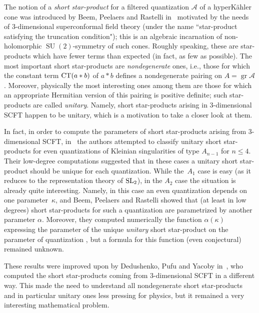 \documentclass[pdftex]{sigma}
\newcommand{\SU}{\mathop{\mathrm{SU}}\nolimits}
\theoremstyle{definition}
\numberwithin{equation}{section}
\begin{document}
The notion of a {\it short star-product} for a filtered quantization $\mathcal A$ of a hyperK\"ahler cone was introduced by Beem, Peelaers and Rastelli in~\cite{BPR} motivated by the needs of 3-dimensional super\-conformal field theory (under the name ``star-product satisfying the truncation condition"); this is an algebraic incarnation of non-holomorphic $\SU(2)$-symmetry of such cones. Roughly speaking, these are star-products which have fewer terms than expected (in fact, as few as possible). The most important short star-products are {\it nondegenerate} ones, i.e., those for which the constant term ${\rm CT}(a*b)$ of $a*b$ defines a nondegenerate pairing on $A=\operatorname{gr} \mathcal A$. Moreover, physically the most interesting ones among them are those for which an appropriate Hermitian version of this pairing is positive definite; such star-products are called {\it unitary}. Namely, short star-products arising in 3-dimensional SCFT happen to be unitary, which is a motivation to take a closer look at them.

In fact, in order to compute the parameters of short star-products arising from 3-dimensional SCFT, in~\cite{BPR} the authors attempted to classify unitary short star-products for even quantizations of Kleinian singularities of type $A_{n-1}$ for $n\le 4$. Their low-degree computations suggested that in these cases a unitary short star-product should be unique for each quantization. While the~$A_1$ case is easy (as it reduces to the representation theory of ${\rm SL}_2$),
in the $A_2$ case the situation is already quite interesting. Namely, in this case an even quantization depends on one parameter~$\kappa$, and
Beem, Peelaers and Rastelli showed that (at least in low degrees) short star-products for such a quantization are parametrized by another parameter $\alpha$. Moreover, they computed numerically the function $\alpha(\kappa)$ expressing the parameter of the unique {\it unitary} short star-product on the parameter of quantization \cite[Fig.~2]{BPR}, but a formula for this function (even conjectural) remained unknown.

These results were improved upon by Dedushenko, Pufu and Yacoby in~\cite{DPY}, who computed the short star-products coming from 3-dimensional SCFT in a different way. This made the need to understand all nondegenerate short star-products and in particular unitary ones less pressing for physics, but it remained a very interesting mathematical problem.
\end{document}
